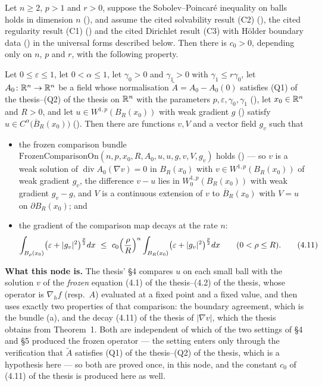 \begin{lemma}
Let $n\ge2$, $p>1$ and $r>0$, suppose the Sobolev--Poincar\'e inequality on
balls holds in dimension $n$ (), and assume
the cited solvability result (C2) (), the cited
regularity result (C1) () and the cited
Dirichlet result (C3) with H\"older boundary data
() in the universal forms described below.  Then
there is $c_0>0$, depending only on $n$, $p$ and $r$, with the following
property.

Let $0\le\varepsilon\le1$, let $0<\alpha\le1$, let $\gamma_0>0$ and
$\gamma_1>0$ with $\gamma_1\le r\gamma_0$, let
$A_0\colon\mathbb{R}^n\to\mathbb{R}^n$ be a field whose normalisation
$\widetilde A=A_0-A_0(0)$ satisfies (Q1) of the thesis--(Q2) of the thesis on $\mathbb{R}^n$ with
the parameters $p,\varepsilon,\gamma_0,\gamma_1$
(), let $x_0\in\mathbb{R}^n$ and $R>0$, and let
$u\in W^{1,p}(B_R(x_0))$ with weak gradient $g$ () satisfy
$u\in C^\alpha\bigl(\overline B_R(x_0)\bigr)$ ().  Then
there are functions $v,V$ and a vector field $g_v$ such that
\begin{itemize}
\item[(a)] the frozen comparison bundle
  $\mathrm{FrozenComparisonOn}(n,p,x_0,R,A_0,u,u,g,v,V,g_v)$ holds
  () --- so $v$ is a weak solution of
  $\operatorname{div}A_0(\nabla v)=0$ in $B_R(x_0)$ with
  $v\in W^{1,p}(B_R(x_0))$ of weak gradient $g_v$, the difference $v-u$ lies in
  $W^{1,p}_0(B_R(x_0))$ with weak gradient $g_v-g$, and $V$ is a continuous
  extension of $v$ to $\overline B_R(x_0)$ with $V=u$ on $\partial B_R(x_0)$;
  and
\item[(b)] the gradient of the comparison map decays at the rate $n$:
  \[
  \int_{B_\rho(x_0)}\bigl(\varepsilon+|g_v|^2\bigr)^{\frac p2}dx
  \ \le\ c_0\Bigl(\frac\rho R\Bigr)^{n}
  \int_{B_R(x_0)}\bigl(\varepsilon+|g_v|^2\bigr)^{\frac p2}dx
  \qquad(0<\rho\le R).
  \tag{4.11}
  \]
\end{itemize}

\noindent\textbf{What this node is.}  The thesis' \S4 compares $u$ on each
small ball with the solution $v$ of the \emph{frozen} equation
(4.1) of the thesis--(4.2) of the thesis, whose operator is $\nabla_hf$ (resp.\ $A$)
evaluated at a fixed point and a fixed value, and then uses exactly two
properties of that comparison: the boundary agreement, which is the bundle (a),
and the decay (4.11) of the thesis of $|\nabla v|$, which the thesis obtains from
Theorem~1.  Both are independent of which of the two settings of \S4 and \S5
produced the frozen operator --- the setting enters only through the
verification that $\widetilde A$ satisfies (Q1) of the thesis--(Q2) of the thesis, which
is a hypothesis here --- so both are proved once, in this node, and the
constant $c_0$ of (4.11) of the thesis is produced here as well.


\end{lemma}
